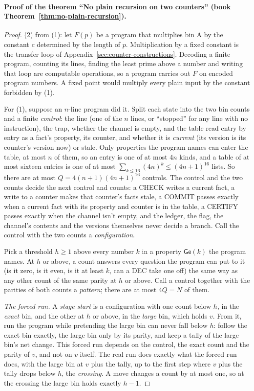 \documentclass[11pt,twoside]{article}
\theoremstyle{thielethm}
\theoremstyle{thieledef}
\theoremstyle{thieledef}
\theoremstyle{thieledef}
\theoremstyle{thielethm}
\theoremstyle{thieleobs}
\theoremstyle{thielethm}
\begin{document}
\paragraph{Proof of the theorem ``No plain recursion on two counters'' (book Theorem~\ref{thm:no-plain-recursion}).}
\begin{proof}
(2) from (1): let $F(p)$ be a program that multiplies bin A by the constant
$c$ determined by the length of $p$. Multiplication by a fixed constant is the
transfer loop of Appendix~\ref{sec:counter-constructions}. Decoding a finite
program, counting its lines, finding the least prime above a number and writing that loop are
computable operations, so a program carries out $F$ on encoded program numbers.
A fixed point would multiply every plain input by the constant forbidden by (1).

For (1), suppose an $n$-line program did it. Split each state into the two bin counts and a
finite \emph{control}: the line (one of the $n$ lines, or ``stopped'' for any line with no
instruction), the trap, whether the channel is empty, and the table read entry by entry as a
fact's property, its counter, and whether it is \emph{current} (its version is its counter's
version now) or stale. Only properties the program names can enter the table, at most $n$ of
them, so an entry is one of at most $4n$ kinds, and a table of at most sixteen entries is one of
at most $\sum_{k \le 16} (4n)^k \le (4n+1)^{16}$ lists. So there are at most
$Q = 4(n+1)(4n+1)^{16}$ controls. The control and the two counts decide the next control and
counts: a CHECK writes a current fact, a write to a counter makes that counter's facts stale, a
COMMIT passes exactly when a current fact with its property and counter is in the table, a
CERTIFY passes exactly when the channel isn't empty, and the ledger, the flag, the channel's
contents and the versions themselves never decide a branch. Call the control with the two counts
a \emph{configuration}.

Pick a threshold $h \ge 1$ above every number $k$ in a property $\mathsf{Ge}(k)$ the program
names. At $h$ or above, a count answers every question the program can put to it (is it zero, is
it even, is it at least $k$, can a DEC take one off) the same way as any other count of the same
parity at $h$ or above. Call a control together with the parities of both counts a
\emph{pattern}; there are at most $4Q = N$ of them.

\emph{The forced run.} A \emph{stage start} is a configuration with one count below $h$, in the
\emph{exact} bin, and the other at $h$ or above, in the \emph{large} bin, which holds $v$. From
it, run the program while pretending the large bin can never fall below $h$: follow the exact bin
exactly, the large bin only by its parity, and keep a tally of the large bin's net change. This
forced run depends on the control, the exact count and the parity of $v$, and not on $v$ itself.
The real run does exactly what the forced run does, with the large bin at $v$ plus the tally, up
to the first step where $v$ plus the tally drops below $h$, the \emph{crossing}. A move changes a
count by at most one, so at the crossing the large bin holds exactly $h - 1$.


\end{proof}
\end{document}
